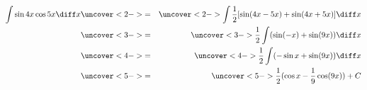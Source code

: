 \begin{frame}
\begin{example} %
\begin{eqnarray*}
\int \sin 4x \cos 5x \diff x & \uncover<2->{ = } & %
\uncover<2->{\int \frac{1}{2} [ \sin (4x - 5x) + \sin (4x + 5x)]\diff x}\\%
 & \uncover<3->{ = } & %
\uncover<3->{\frac{1}{2} \int  ( \sin (-x) + \sin (9x))\diff x}\\%
 & \uncover<4->{ = } & %
\uncover<4->{\frac{1}{2} \int  (-\sin x + \sin (9x))\diff x}\\%
 & \uncover<5->{ = } & %
\uncover<5->{\frac{1}{2}   (\cos x - \frac{1}{9}\cos (9x)) + C}\\%
\end{eqnarray*}
\end{example}
\end{frame}
